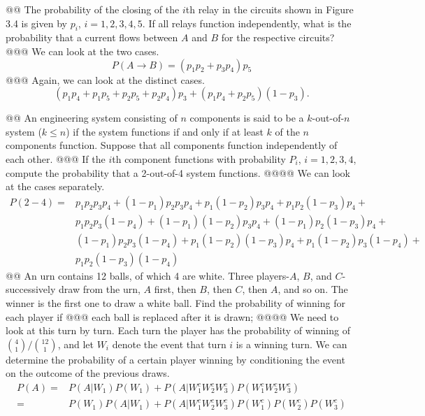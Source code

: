 \documentclass[10pt]{article}
\begin{document}
\begin{easylist}[enumerate]
    @@ The probability of the closing of the $i$th relay in the circuits shown in Figure 3.4 is given by $p_i$, $i = 1,
    2, 3, 4, 5$. If all relays function independently, what is the probability that a current flows between $A$ and $B$
    for the respective circuits?
    @@@ We can look at the two cases.
        \[ P(A\to B) = (p_1 p_2 + p_3 p_4) p_5 \]
    @@@ Again, we can look at the distinct cases.
        \[ (p_1p_4 + p_1p_5 + p_2p_5 + p_2p_4)p_3 + (p_1p_4 + p_2p_5)(1 - p_3).  \]

    @@ An engineering system consisting of $n$ components is said to be a $k$-out-of-$n$ system ($k \le n$) if the
    system functions if and only if at least $k$ of the $n$ components function. Suppose that all components function
    independently of each other.
    @@@ If the $i$th component functions with probability $P_i$, $i = 1, 2, 3, 4$, compute the probability that a
    2-out-of-4 system functions.
    @@@@ We can look at the cases separately.
        \[
            \begin{aligned}
                P(2-4) =& p_1 p_2 p_3 p_4 + (1 - p_1 )p_2 p_3 p_4 + p_1 (1 - p_2 )p_3 p_4 + p_1 p_2 (1 - p_3 )p_4 +\\
                &p_1 p_2 p_3 (1 - p_4 ) + (1 - p_1 )(1 - p_2 )p_3 p_4 + (1 - p_1 )p_2 (1 - p_3 )p_4 +\\
                &(1 - p_1 )p_2 p_3 (1 - p_4 ) + p_1 (1 - p_2 )(1 - p_3 )p_4 + p_1 (1 - p_2 )p_3 (1 - p_4 ) +\\
                &p_1 p_2 (1 - p_3 )(1 - p_4 )
            \end{aligned}
        \]
    @@ An urn contains 12 balls, of which 4 are white. Three players-$A$, $B$, and $C$-successively draw from the urn,
    $A$ first, then $B$, then $C$, then $A$, and so on. The winner is the first one to draw a white ball. Find the
    probability of winning for each player if
    @@@ each ball is replaced after it is drawn;
    @@@@ We need to look at this turn by turn. Each turn the player has the probability of winning of
    $\binom{4}{1}/\binom{12}{1}$, and let $W_i$ denote the event that turn $i$ is a winning turn. We can determine the
    probability of a certain player winning by conditioning the event on the outcome of the previous draws.
        \[
            \begin{aligned}
                P(A) =& P(A|W_1)P(W_1) + P(A|W_1^c W_2^c W_3^c)P(W_1^c W_2^c W_3^c )\\
                     =& P(W_1)P(A|W_1)+P(A|W_1^c W_2^c W_3^c )P (W_1^c )P (W_2^c )P (W_3^c )\\

\end{aligned}\]
\end{easylist}
\end{document}

